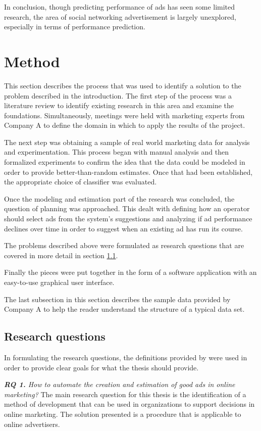 \documentclass{sig-alternate}
\begin{document}
In conclusion, though predicting performance of ads has seen some limited research, the area of social networking advertisement is largely unexplored, especially in terms of performance prediction.

\section{Method}
\label{ch:Method}
This section describes the process that was used to identify a solution to the problem described in the introduction. The first step of the process was a literature review to identify existing research in this area and examine the foundations. Simultaneously, meetings were held with marketing experts from Company A to define the domain in which to apply the results of the project.

The next step was obtaining a sample of real world marketing data for analysis and experimentation. This process began with manual analysis and then formalized experiments to confirm the idea that the data could be modeled in order to provide better-than-random estimates. Once that had been established, the appropriate choice of classifier was evaluated.

Once the modeling and estimation part of the research was concluded, the question of planning was approached. This dealt with defining how an operator should select ads from the system's suggestions and analyzing if ad performance declines over time in order to suggest when an existing ad has run its course.

The problems described above were formulated as research questions that are covered in more detail in section \ref{sec:ResearchQuestions}.

Finally the pieces were put together in the form of a software application with an easy-to-use graphical user interface.

The last subsection in this section describes the sample data provided by Company A to help the reader understand the structure of a typical data set.

\subsection{Research questions}
\label{sec:ResearchQuestions}
In formulating the research questions, the definitions provided by \cite{Shaw2002} were used in order to provide clear goals for what the thesis should provide.

\textit{\textbf{RQ 1.} How to automate the creation and estimation of good ads in online marketing?}
The main research question for this thesis is the identification of a method of development that can be used in organizations to support decisions in online marketing. The solution presented is a procedure that is applicable to online advertisers.
\end{document}
